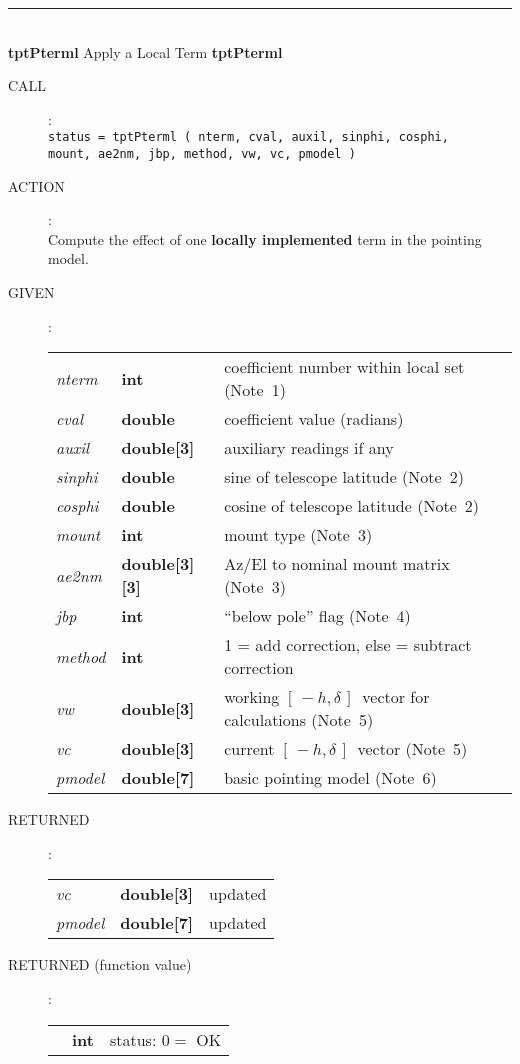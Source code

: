 \documentclass[12pt,fleqn,twoside]{article}
\renewcommand{\_}{{\tt\char'137}}     %
\newcommand{\mhadec}     {$[\,-h,\delta\,]$}
\newcommand{\routine}[2]
{
  \newpage
  \rule{\textwidth}{0.3mm}\\ \nopagebreak
  {\Large {\bf #1} \hfill #2 \hfill {\bf #1}}
  \vspace{-1ex}
}
\newcommand{\call}[1]
{
  \goodbreak
  \begin{description}
    \item[CALL]: \\[0.5ex] \nopagebreak
        {\tt #1}
  \end{description}
  \vspace{-3ex}
}
\newcommand{\action}[1]
{
  \goodbreak
  \begin{description}
    \item[ACTION]: \\[0.5ex] \nopagebreak
        #1
  \end{description}
  \vspace{-3ex}
}
\newcommand{\args}[2]
{
  \goodbreak
  \begin{description}
  \item[#1]: \\[1.5ex] \nopagebreak
    \hspace*{-0.9em}
    \begin{tabular}{p{4.5em}p{5.8em}p{23.5em}}
      #2
    \end{tabular}
  \end{description}
  \vspace{-3ex}
}
\newcommand{\spec}[3]
{
  {\em {#1}} & {\bf \mbox{#2}} & {#3}
}
\begin{document}
\routine{tptPterml}{Apply a Local Term}
\label{tptPterml}
\call{status = tptPterml ( nterm, cval, auxil, sinphi, cosphi, \\
            \hspace*{10em} mount, ae2nm, jbp, method, vw, vc, pmodel )}
\action{Compute the effect of one {\bf locally implemented}
        term in the pointing model.}
\args{GIVEN}
{
\spec{nterm}{int}{coefficient number within local set (Note~1)} \\
\spec{cval}{double}{coefficient value (radians)} \\
\spec{auxil}{double[3]}{auxiliary readings if any} \\
\spec{sinphi}{double}{sine of telescope latitude (Note~2)} \\
\spec{cosphi}{double}{cosine of telescope latitude (Note~2)} \\
\spec{mount}{int}{mount type (Note~3)} \\
\spec{ae2nm}{double[3][3]}{Az/El to nominal mount matrix (Note~3)} \\
\spec{jbp}{int}{``below pole'' flag (Note~4)} \\
\spec{method}{int}{1 = add correction, else = subtract correction} \\
\spec{vw}{double[3]}{working \mhadec\ vector for calculations (Note~5)} \\
\spec{vc}{double[3]}{current \mhadec\ vector (Note~5)} \\
\spec{pmodel}{double[7]}{basic pointing model (Note~6)} \\
}
\args{RETURNED}
{
\spec{vc}{double[3]}{updated} \\
\spec{pmodel}{double[7]}{updated}
}
\args{RETURNED \rm (function value)}
{
\spec{}{int}{status: $0 =$ OK}
}
\end{document}
